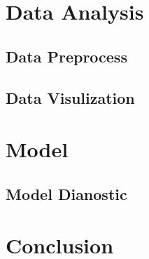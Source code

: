 \documentclass[11pt, a4paper]{article} %
\begin{document}

\section{Data Analysis}
\subsection{Data Preprocess}

\subsection{Data Visulization}


\section{Model}

\subsection{Model Dianostic}


\section{Conclusion}

\newpage %

%



\end{document}
